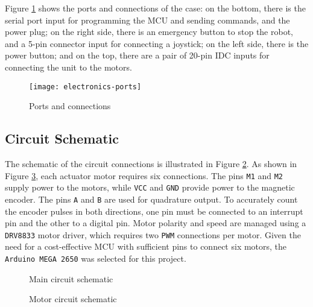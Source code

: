 Figure \ref{fig:electronics-ports} shows the ports and connections of the case: on the bottom, there is the serial port input for programming the MCU and sending commands, and the power plug; on the right side, there is an emergency button to stop the robot, and a 5-pin connector input for connecting a joystick; on the left side, there is the power button; and on the top, there are a pair of 20-pin IDC inputs for connecting the unit to the motors.

\begin{figure}
    \centering
    \texttt{[image: electronics-ports]}
    \caption{Ports and connections}
    \label{fig:electronics-ports}
\end{figure}

\subsection{Circuit Schematic}
The schematic of the circuit connections is illustrated in Figure \ref{fig:main-circuit}. As shown in Figure \ref{fig:motor-circuit}, each actuator motor requires six connections. The pins \texttt{M1} and \texttt{M2} supply power to the motors, while \texttt{VCC} and \texttt{GND} provide power to the magnetic encoder. The pins \texttt{A} and \texttt{B} are used for quadrature output. To accurately count the encoder pulses in both directions, one pin must be connected to an interrupt pin and the other to a digital pin. Motor polarity and speed are managed using a \texttt{DRV8833} motor driver, which requires two \texttt{PWM} connections per motor. Given the need for a cost-effective MCU with sufficient pins to connect six motors, the \texttt{Arduino MEGA 2650} was selected for this project.

\begin{figure}
    \centering
    
    \caption{Main circuit schematic}
    \label{fig:main-circuit}
\end{figure}

\begin{figure}
    \centering
    
    \caption{Motor circuit schematic}
    \label{fig:motor-circuit}
\end{figure}
